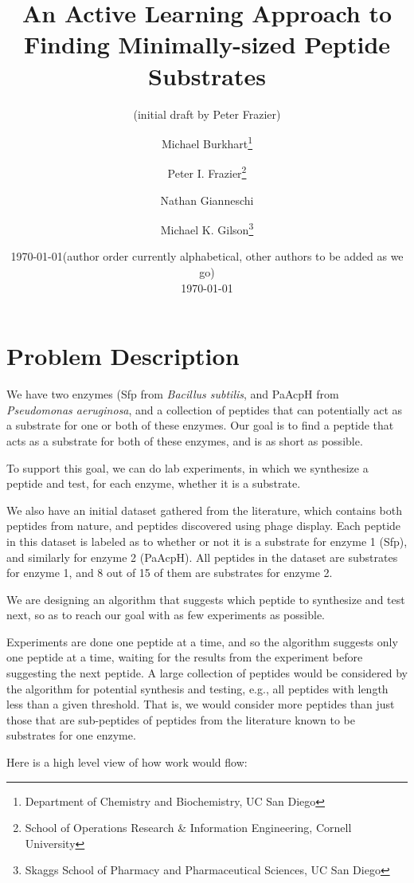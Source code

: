 \documentclass[12pt]{article}
\title{An Active Learning Approach to Finding Minimally-sized Peptide Substrates}
\date{\today}
\author{(initial draft by Peter Frazier)} %
\author{
Michael Burkhart\thanks{Department of Chemistry and Biochemistry, UC San Diego} \and
Peter I. Frazier\thanks{School of Operations Research \& Information Engineering, Cornell University} \and
Nathan Gianneschi\footnotemark[1] \and
Michael K. Gilson\thanks{Skaggs School of Pharmacy and Pharmaceutical Sciences, UC San Diego}
}
\date{(author order currently alphabetical, other authors to be added as we go)\\ \today}
\begin{document}
\maketitle

\section{Problem Description}

We have two enzymes (Sfp from {\it Bacillus subtilis}, and PaAcpH from {\it Pseudomonas aeruginosa}, and a collection of peptides that can potentially act as a substrate for one or both of these enzymes.  Our goal is to find a peptide that acts as a substrate for both of these enzymes, and is as short as possible.

To support this goal, we can do lab experiments, in which we synthesize a peptide and test, for each enzyme, whether it is a substrate.  

We also have an initial dataset gathered from the literature, %
which contains both peptides from nature, and peptides discovered using phage display.
Each peptide in this dataset is labeled as to whether or not it is a substrate for enzyme 1 (Sfp), and similarly for enzyme 2 (PaAcpH).
All peptides in the dataset are substrates for enzyme 1, and 8 out of 15 of them are substrates for enzyme 2.

We are designing an algorithm that suggests which peptide to synthesize and test next, so as to reach our goal with as few experiments as possible.

Experiments are done one peptide at a time, and so the algorithm suggests only one peptide at a time, waiting for the results from the experiment before suggesting the next peptide.
A large collection of peptides would be considered by the algorithm for potential synthesis and testing, e.g., all peptides with length less than a given threshold.  That is, we would consider more peptides than just those that are sub-peptides of peptides from the literature known to be substrates for one enzyme.

Here is a high level view of how work would flow:
\end{document}
